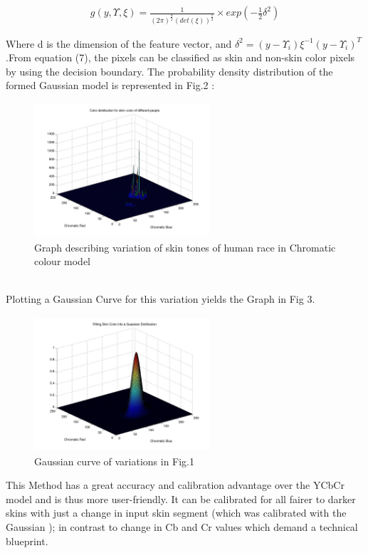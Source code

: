 \documentclass[conference]{IEEEtran}
\begin{document}
\begin{equation}
\begin{aligned}
g(y,\Upsilon,\xi) =  \frac{1}{(2\pi)^{\frac{d}{2}}\left(det\left(\xi \right)\right)^\frac{1}{2}} \times exp(-\frac{1}{2}\delta^2)
\end{aligned}
\end{equation}

Where d is the dimension of the feature vector, and \linebreak
$\delta^2 =(y - \Upsilon_i)\xi^{-1}(y - \Upsilon_i)^T $ .From equation (7), the pixels can be classified as skin and non-skin color pixels by using the decision boundary. The probability density distribution of the formed Gaussian model is represented in Fig.2 :\\
\begin{figure}[h!]
	\centering
	\includegraphics[width = 6.5cm, height = 5cm]{skincolor}
	\caption{ Graph describing variation of skin tones of human race in Chromatic colour model}
\end{figure}\\
Plotting a Gaussian Curve for this variation yields the Graph in Fig 3.\\
\begin{figure}[h!]
	\centering
	\includegraphics[width = 6.5cm, height = 5cm]{gaussian}
	\caption{Gaussian curve of variations in Fig.1}
\end{figure}

This Method has a great accuracy and calibration advantage over the YCbCr model and is thus more user-friendly. It can be calibrated for all fairer to darker skins with just a change in input skin segment (which was calibrated  with the Gaussian ); in contrast to change in Cb and Cr values which demand a technical blueprint.
\end{document}
